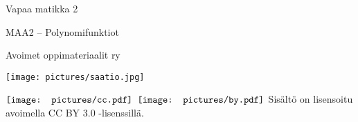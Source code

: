 
\vspace*{3cm}

\begin{center}
    \sffamily
    \begin{doublespace}
        \begin{Huge}
            Vapaa matikka 2 \\
        \end{Huge}
        \vspace*{1cm}
        \begin{LARGE}
            MAA2 -- Polynomifunktiot
        \end{LARGE}

        \vfill

        \begin{LARGE}
            Avoimet oppimateriaalit ry \\
        \end{LARGE}
        \vspace*{1cm}
        \texttt{[image: pictures/saatio.jpg]}
    \end{doublespace}
\end{center}

\vspace*{3cm}

\begin{flushright}
    \sffamily
    $\vcenter{\hbox{\texttt{[image: pictures/cc.pdf]}}}$
    $\vcenter{\hbox{\texttt{[image: pictures/by.pdf]}}}$
    Sisältö on lisensoitu avoimella CC BY 3.0 -lisenssillä.
\end{flushright}
